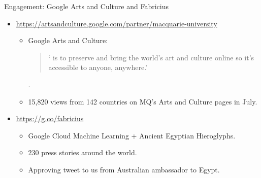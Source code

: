 \documentclass[aspectratio=169, 11pt]{beamer} %
\begin{document}
{%
\begin{frame}{Engagement: Google Arts and Culture and Fabricius}

\begin{itemize}
    \item \url{https://artsandculture.google.com/partner/macquarie-university}
    \begin{itemize}
    \item Google Arts and Culture: 
    \begin{quote}
    ` is to preserve and bring the world’s art and culture online so it’s accessible to anyone, anywhere.'
    \parencite{Google_Arts_and_Culture2020-ga}\end{quote}.
    \item 15,820 views from 142 countries on MQ's Arts and Culture pages in July.
    \end{itemize}
    \item \url{https://g.co/fabricius}
    \begin{itemize}
    \item Google Cloud Machine Learning + Ancient Egyptian Hieroglyphs.
    \item 230 press stories around the world.
    \item Approving tweet to us from Australian ambassador to Egypt.
    \end{itemize}
\end{itemize}

\end{frame}}
\end{document}
